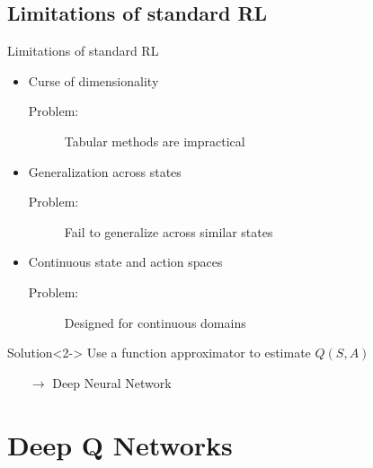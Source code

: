 \documentclass[xcolor=dvipsnames]{beamer}
\begin{document}
\subsection{Limitations of standard RL}
\begin{frame}{Limitations of standard RL}
    \begin{itemize}
        \item Curse of dimensionality
        \begin{description}
            \item[Problem:] Tabular methods are impractical
        \end{description}
        \item Generalization across states
        \begin{description}
            \item[Problem:] Fail to generalize across similar states
        \end{description}
        \item Continuous state and action spaces
        \begin{description}
            \item[Problem:] Designed for continuous domains
        \end{description}
    \end{itemize}
    \begin{block}{Solution}<2->
        Use a function approximator to estimate $Q(S,A)$
        \begin{itemize}
            \item[$\boldsymbol{\rightarrow}$] Deep Neural Network
        \end{itemize}
    \end{block}
\end{frame}


\section{Deep Q Networks}
\end{document}
